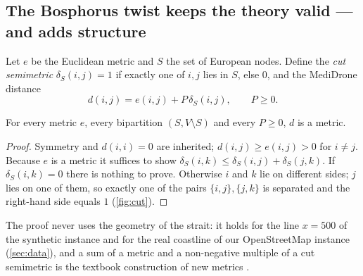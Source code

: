 \subsection{The Bosphorus twist keeps the theory valid --- and adds structure}
Let $e$ be the Euclidean metric and $S$ the set of European nodes. Define the \emph{cut semimetric}
$\delta_S(i,j)=1$ if exactly one of $i,j$ lies in $S$, else $0$, and the MediDrone distance
\begin{equation}
  d(i,j)=e(i,j)+P\,\delta_S(i,j),\qquad P\ge 0. \label{eq:bosphorus}
\end{equation}
\begin{theorem}\label{thm:metric}
For every metric $e$, every bipartition $(S,V\setminus S)$ and every $P\ge0$, $d$ is a metric.
\end{theorem}
\begin{proof}
Symmetry and $d(i,i)=0$ are inherited; $d(i,j)\ge e(i,j)>0$ for $i\ne j$. Because $e$ is a metric it suffices
to show $\delta_S(i,k)\le\delta_S(i,j)+\delta_S(j,k)$. If $\delta_S(i,k)=0$ there is nothing to prove.
Otherwise $i$ and $k$ lie on different sides; $j$ lies on one of them, so exactly one of the pairs
$\{i,j\},\{j,k\}$ is separated and the right-hand side equals $1$ (\cref{fig:cut}).
\end{proof}
The proof never uses the geometry of the strait: it holds for the line $x=500$ of the synthetic
instance and for the real coastline of our OpenStreetMap instance (\cref{sec:data}), and a sum of a metric and a non-negative multiple of a cut semimetric is the textbook construction of new metrics \citep{deza1997geometry}.

